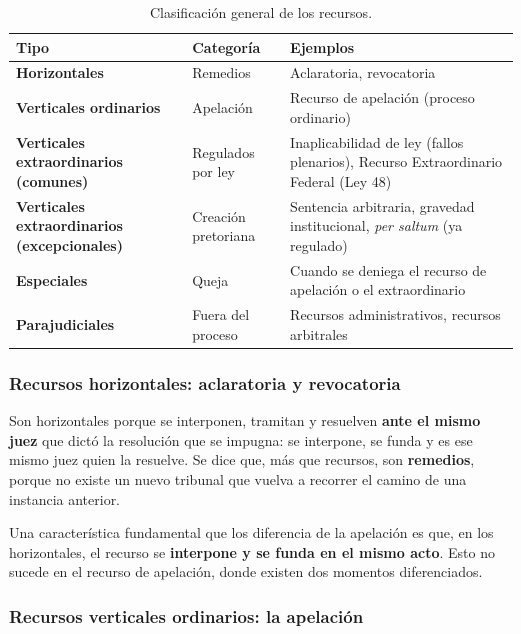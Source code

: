 \documentclass[12pt,oneside]{book}
\begin{document}
\begin{table}[H]
\centering
\begin{tabularx}{\textwidth}{
    >{\raggedright\arraybackslash}p{}
    >{\raggedright\arraybackslash}p{}
    >{\raggedright\arraybackslash}X
}
\toprule
\textbf{Tipo} & \textbf{Categoría} & \textbf{Ejemplos} \\
\midrule
\textbf{Horizontales} & Remedios & Aclaratoria, revocatoria \\
\addlinespace
\textbf{Verticales ordinarios} & Apelación & Recurso de apelación (proceso ordinario) \\
\addlinespace
\textbf{Verticales extraordinarios (comunes)} & Regulados por ley & Inaplicabilidad de ley (fallos plenarios), Recurso Extraordinario Federal (Ley 48) \\
\addlinespace
\textbf{Verticales extraordinarios (excepcionales)} & Creación pretoriana & Sentencia arbitraria, gravedad institucional, \textit{per saltum} (ya regulado) \\
\addlinespace
\textbf{Especiales} & Queja & Cuando se deniega el recurso de apelación o el extraordinario \\
\addlinespace
\textbf{Parajudiciales} & Fuera del proceso & Recursos administrativos, recursos arbitrales \\
\bottomrule
\end{tabularx}
\caption{Clasificación general de los recursos.}
\end{table}

\subsubsection{Recursos horizontales: aclaratoria y revocatoria}

Son horizontales porque se interponen, tramitan y resuelven \textbf{ante el mismo juez} que dictó la resolución que se impugna: se interpone, se funda y es ese mismo juez quien la resuelve. Se dice que, más que recursos, son \textbf{remedios}, porque no existe un nuevo tribunal que vuelva a recorrer el camino de una instancia anterior.

Una característica fundamental que los diferencia de la apelación es que, en los horizontales, el recurso se \textbf{interpone y se funda en el mismo acto}. Esto no sucede en el recurso de apelación, donde existen dos momentos diferenciados.

\subsubsection{Recursos verticales ordinarios: la apelación}
\end{document}
